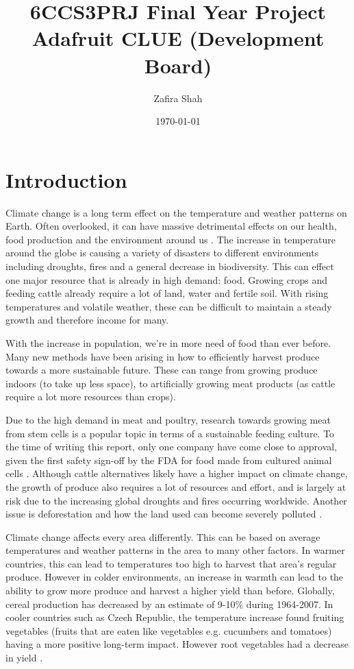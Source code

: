 \documentclass[11pt]{informatics-report}
\title{6CCS3PRJ Final Year Project\\\vspace{0.2cm}Adafruit CLUE (Development Board)}
\author{Zafira Shah}
\date{\today}
\begin{document}
\createFrontMatter
\onehalfspacing
\tableofcontents
\doublespacing


\chapter{Introduction}
Climate change is a long term effect on the temperature and weather patterns on Earth. Often overlooked, it can have massive detrimental effects on our health, food production and the environment around us \cite{unitedNations}. The increase in temperature around the globe is causing a variety of disasters to different environments including droughts, fires and a general decrease in biodiversity. This can effect one major resource that is already in high demand: food. Growing crops and feeding cattle already require a lot of land, water and fertile soil. With rising temperatures and volatile weather, these can be difficult to maintain a steady growth and therefore income for many.

With the increase in population, we’re in more need of food than ever before. Many new methods have been arising in how to efficiently harvest produce towards a more sustainable future. These can range from growing produce indoors (to take up less space), to artificially growing meat products (as cattle require a lot more resources than crops).

Due to the high demand in meat and poultry, research towards growing meat from stem cells is a popular topic in terms of a sustainable feeding culture. To the time of writing this report, only one company have come close to approval, given the first safety sign-off by the FDA for food made from cultured animal cells \cite{FDA}. Although cattle alternatives likely have a higher impact on climate change, the growth of produce also requires a lot of resources and effort, and is largely at risk due to the increasing global droughts and fires occurring worldwide. Another issue is deforestation and how the land used can become severely polluted \cite{foodWasteAshok}.

Climate change affects every area differently. This can be based on average temperatures and weather patterns in the area to many other factors. \cite{agriculturalAdaptationAnderson} In warmer countries, this can lead to temperatures too high to harvest that area’s regular produce. However in colder environments, an increase in warmth can lead to the ability to grow more produce and harvest a higher yield than before. Globally, cereal production has decreased by an estimate of 9-10\% during 1964-2007. In cooler countries such as Czech Republic, the temperature increase found fruiting vegetables (fruits that are eaten like vegetables e.g. cucumbers and tomatoes) having a more positive long-term impact. However root vegetables had a decrease in yield \cite{CzechPotopova}.
\end{document}
